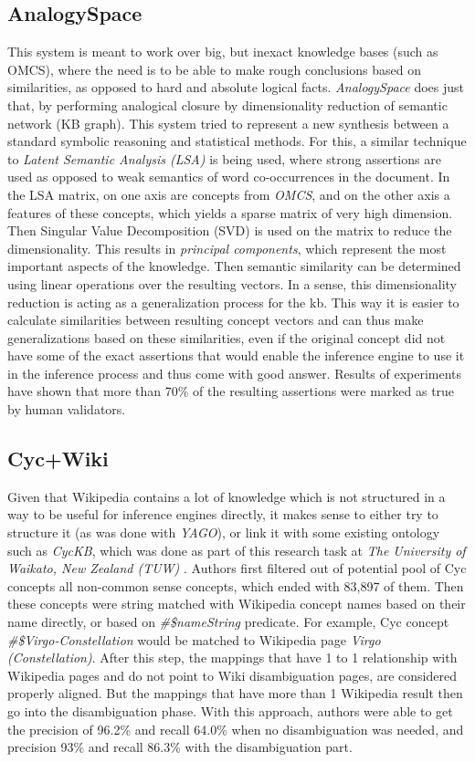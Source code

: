 \subsection{AnalogySpace}
This system is meant to work over big, but inexact knowledge bases (such as OMCS), where the need is to be able to make rough conclusions based
on similarities, as opposed to hard and absolute logical facts. 
\emph{AnalogySpace} does just that, by performing analogical closure by
dimensionality reduction of semantic network (KB graph)\parencite{Speer2008}. 
This system tried to represent a new synthesis between a standard symbolic 
reasoning and statistical methods. For this, a similar technique to 
\emph{Latent Semantic Analysis (LSA)} is being used, where strong assertions
are used as
opposed to weak semantics of word co-occurrences in the document. In the 
LSA matrix, on one axis are concepts from \emph{OMCS}, and on the other
axis a features of these concepts, which yields a sparse matrix of very
high dimension. Then Singular Value Decomposition (SVD) is used on the matrix
to reduce the dimensionality. This results in \emph{principal components},
which represent the most important aspects of the knowledge. Then semantic
similarity can be determined using linear operations over the resulting vectors.
In a sense, this dimensionality reduction is acting as a generalization process
for the kb. This way it is easier to calculate similarities between resulting
concept vectors and can thus make generalizations based on these similarities,
even if the original concept did not have some of the exact assertions that would enable the inference engine to use it in the inference process and thus come with
good answer. 
Results of experiments have shown that more than 70\% of the resulting 
assertions were marked as true by human validators.

\subsection{Cyc+Wiki}
\label{section:r:cycwiki}
Given that Wikipedia contains a lot of knowledge which is not structured in 
a way to be useful for inference engines directly, it makes sense to either try
to structure it (as was done with \emph{YAGO}), or link it with some existing
ontology such as \emph{CycKB}, which was done as part of this research task
at \emph{The University of Waikato, New Zealand (TUW)} \parencite{Medelyan2008}.
Authors first filtered out of potential pool of Cyc concepts all non-common 
sense concepts, which ended with 83,897 of them. Then these concepts were
string matched with Wikipedia concept names based on their name directly,
or based on \emph{\#\$nameString} predicate. For example, Cyc concept
\emph{\#\$Virgo-Constellation} would be matched to Wikipedia page 
\emph{Virgo (Constellation)}. After this step, the mappings that have 1 to 1
relationship with Wikipedia pages and do not point to Wiki disambiguation pages,
are considered properly aligned. But the mappings that have more than 1 
Wikipedia result then go into the disambiguation phase. With this approach,
authors were able to get the precision of 96.2\% and recall 64.0\% when no 
disambiguation was needed, and precision 93\% and recall 86.3\% with the 
disambiguation part.


